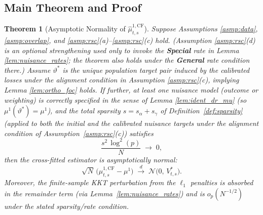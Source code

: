 \documentclass{article}
\newtheorem{theorem}{Theorem}[section]
\begin{document}
\subsection{Main Theorem and Proof}\label{sec:main_normality}

\begin{theorem}[Asymptotic Normality of $\widehat{\mu}^{1,\mathrm{CF}}_{t,s}$]\label{thm:main}
Suppose Assumptions \ref{asmp:data}, \ref{asmp:overlap}, and \ref{asmp:rsc}(a)--\ref{asmp:rsc}(c) hold. (Assumption \ref{asmp:rsc}(d) is an optional strengthening used only to invoke the \textbf{Special} rate in Lemma \ref{lem:nuisance_rates}; the theorem also holds under the \textbf{General} rate condition there.) Assume $\vartheta^*$ is the unique population target pair induced by the calibrated losses under the alignment condition in Assumption \ref{asmp:rsc}(c), implying Lemma \ref{lem:ortho_foc} holds. If further, at least one nuisance model (outcome or weighting) is correctly specified in the sense of Lemma \ref{lem:ident_dr_mu} (so $\mu^1(\vartheta^*)=\mu^1$), and the total sparsity $s=s_\alpha+s_\gamma$ of Definition~\ref{def:sparsity} (applied to both the initial and the calibrated nuisance targets under the alignment condition of Assumption~\ref{asmp:rsc}(c)) satisfies
\[
\frac{s^2\, \log^2(p)}{N}\;\longrightarrow\;0,
\]
then the cross-fitted estimator is asymptotically normal:
\[
\sqrt{N}\,\big(\widehat{\mu}^{1,\mathrm{CF}}_{t,s} - \mu^1\big)
\;\xrightarrow{d}\; \mathcal{N}\!\big(0,\,V^*_{t,s}\big).
\]
Moreover, the finite-sample KKT perturbation from the $\ell_1$ penalties is absorbed in the remainder term (via Lemma~\ref{lem:nuisance_rates}) and is $o_p(N^{-1/2})$ under the stated sparsity/rate condition.
\end{theorem}
\end{document}
